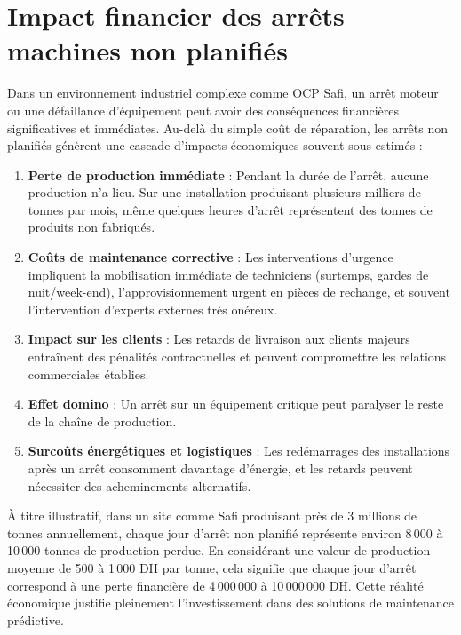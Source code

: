 \documentclass[a4paper,12pt]{report}
\begin{document}
\section*{Impact financier des arrêts machines non planifiés}

Dans un environnement industriel complexe comme OCP Safi, un arrêt moteur ou une défaillance d'équipement peut avoir des conséquences financières significatives et immédiates. Au-delà du simple coût de réparation, les arrêts non planifiés génèrent une cascade d'impacts économiques souvent sous-estimés :

\begin{enumerate}
    \item \textbf{Perte de production immédiate} : Pendant la durée de l'arrêt, aucune production n'a lieu. Sur une installation produisant plusieurs milliers de tonnes par mois, même quelques heures d'arrêt représentent des tonnes de produits non fabriqués.
    
    \item \textbf{Coûts de maintenance corrective} : Les interventions d'urgence impliquent la mobilisation immédiate de techniciens (surtemps, gardes de nuit/week-end), l'approvisionnement urgent en pièces de rechange, et souvent l'intervention d'experts externes très onéreux.
    
    \item \textbf{Impact sur les clients} : Les retards de livraison aux clients majeurs entraînent des pénalités contractuelles et peuvent compromettre les relations commerciales établies.
    
    \item \textbf{Effet domino} : Un arrêt sur un équipement critique peut paralyser le reste de la chaîne de production.
    
    \item \textbf{Surcoûts énergétiques et logistiques} : Les redémarrages des installations après un arrêt consomment davantage d'énergie, et les retards peuvent nécessiter des acheminements alternatifs.
\end{enumerate}

À titre illustratif, dans un site comme Safi produisant près de 3 millions de tonnes annuellement, chaque jour d'arrêt non planifié représente environ 8\,000 à 10\,000 tonnes de production perdue. En considérant une valeur de production moyenne de 500 à 1\,000 DH par tonne, cela signifie que chaque jour d'arrêt correspond à une perte financière de 4\,000\,000 à 10\,000\,000 DH. Cette réalité économique justifie pleinement l'investissement dans des solutions de maintenance prédictive.
\end{document}
